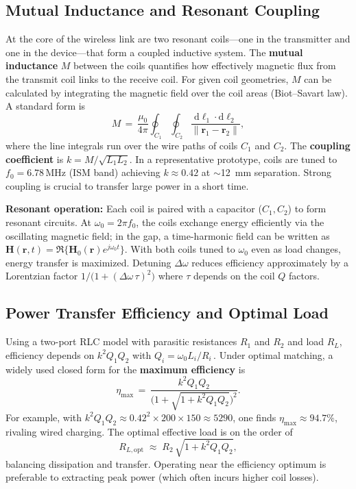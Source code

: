 \documentclass[11pt]{article}
\begin{document}
\subsection{Mutual Inductance and Resonant Coupling}
At the core of the wireless link are two resonant coils---one in the transmitter and one in the device---that form a coupled inductive system. The \textbf{mutual inductance} $M$ between the coils quantifies how effectively magnetic flux from the transmit coil links to the receive coil. For given coil geometries, $M$ can be calculated by integrating the magnetic field over the coil areas (Biot--Savart law). A standard form is
\begin{equation}
  M \,=\, \frac{\mu_0}{4\pi} \oint_{C_1} \oint_{C_2} \frac{\mathrm{d}\boldsymbol{\ell}_1 \cdot \mathrm{d}\boldsymbol{\ell}_2}{\lVert \boldsymbol{r}_1 - \boldsymbol{r}_2 \rVert},
\end{equation}
where the line integrals run over the wire paths of coils $C_1$ and $C_2$. The \textbf{coupling coefficient} is $k = M/\sqrt{L_1 L_2}$. In a representative prototype, coils are tuned to $f_0 = 6.78\,\mathrm{MHz}$ (ISM band) achieving $k\approx0.42$ at $\sim$12~mm separation. Strong coupling is crucial to transfer large power in a short time.

\textbf{Resonant operation:} Each coil is paired with a capacitor ($C_1, C_2$) to form resonant circuits. At $\omega_0=2\pi f_0$, the coils exchange energy efficiently via the oscillating magnetic field; in the gap, a time-harmonic field can be written as $\boldsymbol{H}(\boldsymbol{r},t)=\Re\{\boldsymbol{H}_0(\boldsymbol{r}) e^{j\omega_0 t}\}$. With both coils tuned to $\omega_0$ even as load changes, energy transfer is maximized. Detuning $\Delta\omega$ reduces efficiency approximately by a Lorentzian factor $1/\bigl(1+(\Delta\omega\,\tau)^2\bigr)$ where $\tau$ depends on the coil $Q$ factors.

\subsection{Power Transfer Efficiency and Optimal Load}
Using a two-port RLC model with parasitic resistances $R_1$ and $R_2$ and load $R_L$, efficiency depends on $k^2 Q_1 Q_2$ with $Q_i=\omega_0 L_i/R_i$\,\cite{nature-wpt}. Under optimal matching, a widely used closed form for the \textbf{maximum efficiency} is
\begin{equation}
  \eta_{\max} \,=\, \frac{k^2 Q_1 Q_2}{\bigl(1+\sqrt{1+k^2 Q_1 Q_2}\bigr)^2}.
\end{equation}
For example, with $k^2 Q_1 Q_2 \approx 0.42^2\times200\times150\approx5290$, one finds $\eta_{\max}\approx94.7\%$, rivaling wired charging. The optimal effective load is on the order of
\begin{equation}
  R_{L,\mathrm{opt}} \;\approx\; R_2\,\sqrt{1 + k^2 Q_1 Q_2},
\end{equation}
balancing dissipation and transfer. Operating near the efficiency optimum is preferable to extracting peak power (which often incurs higher coil losses).
\end{document}

